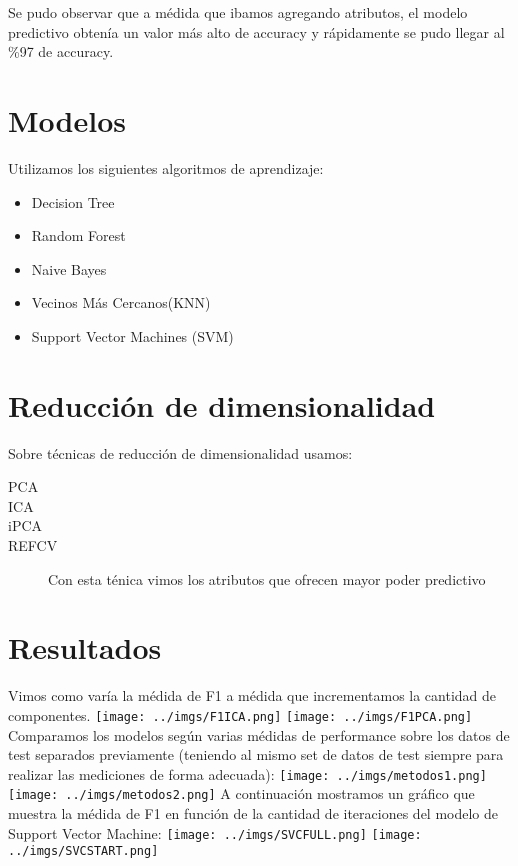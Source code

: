 \documentclass[10pt, a4paper]{article}
\begin{document}
Se pudo observar que a médida que ibamos agregando atributos, el modelo predictivo obtenía un valor más alto de accuracy y rápidamente se pudo llegar al \%97 de accuracy.

\section{Modelos}
Utilizamos los siguientes algoritmos de aprendizaje:

\begin{itemize}
\item Decision Tree
\item Random Forest
\item Naive Bayes
\item Vecinos Más Cercanos(KNN)
\item Support Vector Machines (SVM)
\end{itemize}


\section{Reducción de dimensionalidad} 
Sobre técnicas de reducción de dimensionalidad usamos:

\begin{description}
\item [PCA] 
\item [ICA]
\item [iPCA]
\item [REFCV] Con esta ténica vimos los atributos que ofrecen mayor poder predictivo
\end{description}

\section{Resultados}

Vimos como varía la médida de F1 a médida que incrementamos la cantidad de componentes.
\texttt{[image: ../imgs/F1ICA.png]}
\texttt{[image: ../imgs/F1PCA.png]}
Comparamos los modelos según varias médidas de performance sobre los datos de test separados previamente (teniendo al mismo set de datos de test siempre para realizar las mediciones de forma adecuada):
\texttt{[image: ../imgs/metodos1.png]}
\texttt{[image: ../imgs/metodos2.png]}
A continuación mostramos un gráfico que muestra la médida de F1 en función de la cantidad de iteraciones del modelo de Support Vector Machine:
\texttt{[image: ../imgs/SVCFULL.png]}
\texttt{[image: ../imgs/SVCSTART.png]}
\end{document}
